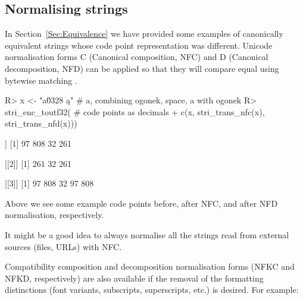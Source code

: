 \documentclass[nojss]{jss}
\begin{document}









%
%
%
%
%
%
%
%
%
%
%
%








\subsection{Normalising strings}\label{Sec:normalisation}

In Section~\ref{Sec:Equivalence} we have provided some examples
of canonically equivalent strings whose code point representation was different.
Unicode normalisation forms C (Canonical composition, NFC) and D
(Canonical decomposition, NFD) can be applied so that they
will compare equal using bytewise matching \citep{usa15:normalization}.

\begin{Schunk}
\begin{Sinput}
R> x <- "a\u0328 ą"   # a, combining ogonek, space, a with ogonek
R> stri_enc_toutf32(  # code points as decimals
+    c(x, stri_trans_nfc(x), stri_trans_nfd(x)))
\end{Sinput}
\begin{Soutput}
[[1]]
[1]  97 808  32 261

[[2]]
[1] 261  32 261

[[3]]
[1]  97 808  32  97 808
\end{Soutput}
\end{Schunk}

Above we see some example code points before, after NFC,
and after NFD normalisation, respectively.

It might be a good idea to always normalise all the strings
read from external sources (files, URLs) with NFC.

Compatibility composition and decomposition normalisation forms (NFKC and
NFKD, respectively) are also available if
the removal of the formatting distinctions (font variants,
subscripts, superscripts, etc.) is desired. For example:
\end{document}
